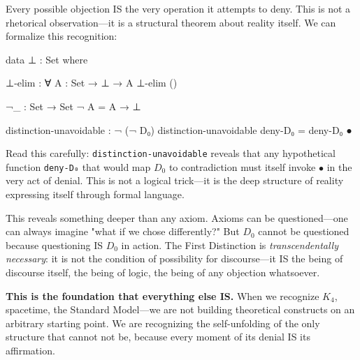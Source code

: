 \documentclass[11pt,a4paper]{book}
\begin{document}
Every possible objection IS the very operation it attempts to deny. This is not a rhetorical observation—it is a structural theorem about reality itself. We can formalize this recognition:

\begin{code}
data ⊥ : Set where

⊥-elim : ∀ {A : Set} → ⊥ → A
⊥-elim ()

¬_ : Set → Set
¬ A = A → ⊥

distinction-unavoidable : ¬ (¬ D₀)
distinction-unavoidable deny-D₀ = deny-D₀ ●
\end{code}

Read this carefully: \texttt{distinction-unavoidable} reveals that any hypothetical function \texttt{deny-D₀} that would map $D_0$ to contradiction must itself invoke $\bullet$ in the very act of denial. This is not a logical trick—it is the deep structure of reality expressing itself through formal language.

\begin{center}
\end{center}

This reveals something deeper than any axiom. Axioms can be questioned—one can always imagine "what if we chose differently?" But $D_0$ cannot be questioned because questioning IS $D_0$ in action. The First Distinction is \emph{transcendentally necessary}: it is not the condition of possibility for discourse—it IS the being of discourse itself, the being of logic, the being of any objection whatsoever.

\textbf{This is the foundation that everything else IS.} When we recognize $K_4$, spacetime, the Standard Model—we are not building theoretical constructs on an arbitrary starting point. We are recognizing the self-unfolding of the only structure that cannot not be, because every moment of its denial IS its affirmation.
\end{document}
